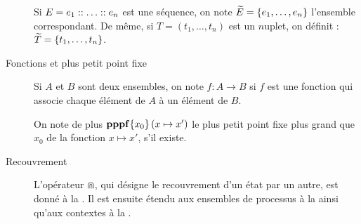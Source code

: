 \begin{description}
    Si $E = e_1 :: \ldots :: e_n$ est une séquence,
    on note $\widetilde{E} = \{ e_1, \ldots, e_n \}$ l'ensemble correspondant.
    De même, si $T = (t_1, \ldots, t_n)$ est un $n$\nbd uplet,
    on définit : $\widetilde{T} = \{ t_1, \ldots, t_n \}$.
  
  \item[Fonctions et plus petit point fixe]
    Si $A$ et $B$ sont deux ensembles,
    on note $f : A \rightarrow B$
    si $f$ est une fonction qui associe chaque élément de $A$ à un élément de $B$.
    
    On note de plus $\mathbf{pppf}\{x_0\}\left(x\mapsto x'\right)$ le plus petit point fixe plus grand que $x_0$
    de la fonction $x \mapsto x'$, s'il existe.
  
  \item[Recouvrement]
    L'opérateur $\Cap$, qui désigne le recouvrement d'un état par un autre,
    est donné à la .
    Il est ensuite étendu aux ensembles de processus à la 
    ainsi qu'aux contextes à la .
\end{description}

